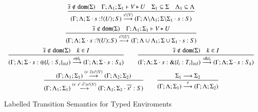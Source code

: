 \begin{figure}
	\[
	\begin{array}{c}
		\tree{
			\dual{s} \notin \dom{\Sigma} \quad \Gamma; \Lambda_1; \Sigma_1 \proves V \hastype U \quad \Sigma_1 \subseteq \Sigma \quad \Lambda_1 \subseteq \Lambda
		}{
			(\Gamma; \Lambda; \Sigma \cat s: \btout{U} S) \by{\bactout{s}{V}} (\Gamma; \Lambda\backslash\Lambda_1; \Sigma\backslash\Sigma_1 \cat s: S)
		}
		\\[6mm]
		\tree{
			\dual{s} \notin \dom{\Sigma} \quad  \Gamma; \Lambda_1; \Sigma_1 \proves V \hastype U
		}{
			(\Gamma; \Lambda; \Sigma \cat s: \btinp{U} S) \by{\bactinp{s}{U}} (\Gamma; \Lambda \cup \Lambda_1; \Sigma \cup \Sigma_1 \cat s: S)
		}
		\\[6mm]
		\tree{
			\dual{s} \notin \dom{\Sigma} \quad k \in I
		}{
			(\Gamma; \Lambda; \Sigma \cat s: \btsel{l_i: S_i}_{i \in I}) \by{\bactsel{s}{l_k}} (\Gamma; \Lambda; \Sigma \cat s:S_k)
		}
		\qquad
		\tree{
			\dual{s} \notin \dom{\Sigma} \quad k \in I
		}{
			(\Gamma; \Lambda; \Sigma \cat s: \btbra{l_i: T_i}_{i \in I}) \by{\bactbra{s}{l_k}} (\Gamma; \Lambda; \Sigma \cat s:S_k)
		}
		\\[6mm]

		\tree{
			(\Gamma; \Lambda_1; \Sigma_1) \by{\news{\tilde{s}} \bactout{s}{V}} (\Gamma; \Lambda_2; \Sigma_2)
		}{
			(\Gamma; \Lambda_1; \Sigma_1) \by{\news{s' \cat \tilde{s'}} \bactout{s}{V}} (\Gamma; \Lambda_2; \Sigma_2 \cat \dual{s'}: S)
		}
		\qquad
		\tree{
			\Sigma_1 \red \Sigma_2
		}{
			(\Gamma; \Lambda; \Sigma_1) \by{\tau} (\Gamma; \Lambda; \Sigma_2)
		}
	\end{array}
	\]
	\caption{Labelled Transition Semantics for Typed Enviroments \label{fig:envLTS}}
\end{figure}
